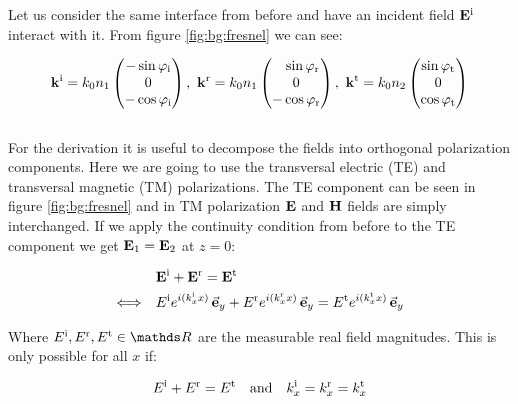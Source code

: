 Let us consider the same interface from before and have an incident field
$\vb E^{\mathrm{i}}$ interact with it. From figure \ref{fig:bg:fresnel} we can see:

\begin{equation} \label{eq:bg:k}
    \vb k^{\mathrm{i}} = k_0 n_1
    \begin{pmatrix}
        -\sin \varphi_{\mathrm{i}}\\ 0\\ -\cos \varphi_{\mathrm{i}}
    \end{pmatrix}
    , \
    \vb k^{\mathrm{r}} = k_0 n_1
    \begin{pmatrix}
        \phantom{-} \sin \varphi_{\mathrm{r}} \\ 0\\ -\cos \varphi_{\mathrm{r}}
    \end{pmatrix}
    , \
    \vb k^{\mathrm{t}} = k_0 n_2
    \begin{pmatrix}
        \sin \varphi_{\mathrm{t}}\\ 0\\ \cos \varphi_{\mathrm{t}}
    \end{pmatrix}
\end{equation} 
\\

For the derivation it is useful to decompose the fields into orthogonal polarization components. Here we are going to use the transversal electric (TE) and transversal magnetic (TM) polarizations. The TE component can be seen in figure \ref{fig:bg:fresnel} and in TM polarization $\vb E$ and $\vb H$ fields are simply interchanged.
If we apply the continuity condition from before to the TE component we get $\vb E_1 = \vb E_2$ at $z = 0$:

\begin{equation}
\begin{aligned}
    &\vb E^{\mathrm{i}} + \vb E^{\mathrm{r}} = \vb E^{\mathrm{t}} \\
    \Longleftrightarrow \quad
    &E^{\mathrm{i}} e^{i(k^{\mathrm{i}}_x x)} \, \va e_y +
    E^{\mathrm{r}} e^{i(k^{\mathrm{r}}_x x)} \, \va e_y = 
    E^{\mathrm{t}} e^{i(k^{\mathrm{t}}_x x)} \, \va e_y
\end{aligned}
\end{equation}

Where $E^\s i, E^\s r, E^\s t \in \mathds R$ are the measurable real field magnitudes. This is only possible for all $x$ if:

\begin{equation} \label{eq:bg:x}
    E^\s{i} + E^\s{r} = E^\s{t} \qq{and}
    k^\s{i}_x = k^\s{r}_x = k^\s{t}_x
\end{equation}

